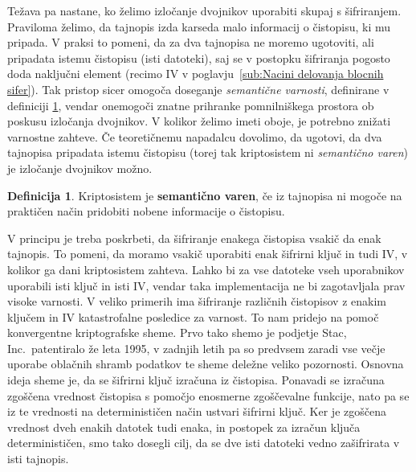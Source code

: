 \documentclass[12pt,a4paper,openany,tikz]{book}
\theoremstyle{plain}
\theoremstyle{definition}
\newtheorem{defn}[thm]{Definicija} %
\begin{document}
Težava pa nastane, ko želimo izločanje dvojnikov uporabiti skupaj s šifriranjem. Praviloma želimo, da tajnopis izda karseda malo informacij o čistopisu, ki mu pripada. V praksi to pomeni, da za dva tajnopisa ne moremo ugotoviti, ali pripadata istemu čistopisu (isti datoteki), saj se v postopku šifriranja pogosto doda naključni element (recimo \gls{IV} v poglavju~\ref{sub:Nacini delovanja blocnih sifer}). Tak pristop sicer omogoča doseganje \textit{semantične varnosti}, definirane v definiciji \ref{def:semsec}, vendar onemogoči znatne prihranke pomnilniškega prostora ob poskusu izločanja dvojnikov. V kolikor želimo imeti oboje, je potrebno znižati varnostne zahteve. Če teoretičnemu napadalcu dovolimo, da ugotovi, da dva tajnopisa pripadata istemu čistopisu (torej tak kriptosistem ni \textit{semantično varen}) je izločanje dvojnikov možno.

\begin{mdframed}
  \begin{defn}
    Kriptosistem je \textbf{semantično varen}, če iz tajnopisa ni mogoče na praktičen način pridobiti nobene informacije o čistopisu.
    \label{def:semsec}
  \end{defn}
\end{mdframed}

V principu je treba poskrbeti, da šifriranje enakega čistopisa vsakič da enak tajnopis. To pomeni, da moramo vsakič uporabiti enak šifrirni ključ in tudi \gls{IV}, v kolikor ga dani kriptosistem zahteva. Lahko bi za vse datoteke vseh uporabnikov uporabili isti ključ in isti \gls{IV}, vendar taka implementacija ne bi zagotavljala prav visoke varnosti. V veliko primerih ima šifriranje različnih čistopisov z enakim ključem in IV katastrofalne posledice za varnost. To nam pridejo na pomoč konvergentne kriptografske sheme. Prvo tako shemo je podjetje Stac, Inc.\ patentiralo že leta 1995, v zadnjih letih pa so predvsem zaradi vse večje uporabe oblačnih shramb podatkov te sheme deležne veliko pozornosti. Osnovna ideja sheme je, da se šifrirni ključ izračuna iz čistopisa. Ponavadi se izračuna zgoščena vrednost čistopisa s pomočjo enosmerne zgoščevalne funkcije, nato pa se iz te vrednosti na determinističen način ustvari šifrirni ključ. Ker je zgoščena vrednost dveh enakih datotek tudi enaka, in postopek za izračun ključa determinističen, smo tako dosegli cilj, da se dve isti datoteki vedno zašifrirata v isti tajnopis.
\end{document}
